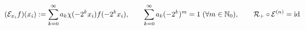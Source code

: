 \documentclass[preview]{standalone}
\begin{document}
\begin{align*}
\special{dvisvgm:raw <g id='unique000'>}(\mathcal{E}_{x_i} f)(x_i) := \sum_{k=0}^\infty a_k \chi(-2^k x_i) f(-2^k x_i), \qquad \sum_{k=0}^\infty a_k (-2^k)^m = 1\;(\forall m\in\mathbb{N}_0), \qquad \mathcal{R}_+\circ\mathcal{E}^{(n)} = \operatorname{id}\special{dvisvgm:raw </g>}
\end{align*}
\end{document}
